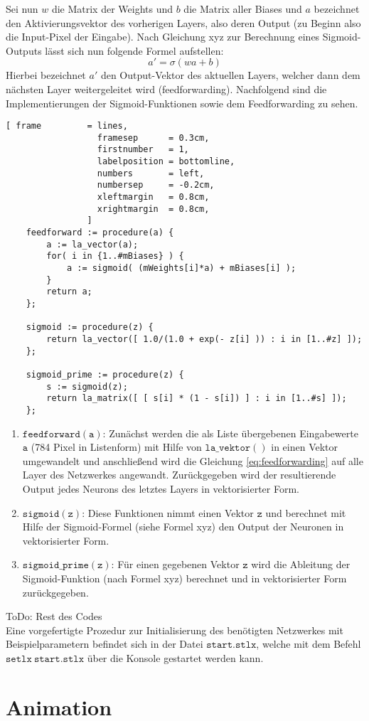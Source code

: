 \noindent
Sei nun $w$ die Matrix der Weights und $b$ die Matrix aller Biases und $a$ bezeichnet den Aktivierungsvektor des vorherigen Layers, also deren Output (zu Beginn also die Input-Pixel der Eingabe). Nach Gleichung xyz zur Berechnung eines Sigmoid-Outputs lässt sich nun folgende Formel aufstellen: 
\begin{equation}\label{eq:feedforwarding}
	a' = \sigma(wa + b)
\end{equation}
\noindent
Hierbei bezeichnet $a'$ den Output-Vektor des aktuellen Layers, welcher dann dem nächsten Layer weitergeleitet wird (feedforwarding). Nachfolgend sind die Implementierungen der Sigmoid-Funktionen sowie dem Feedforwarding zu sehen.
\begin{Verbatim}[ frame         = lines, 
                  framesep      = 0.3cm, 
                  firstnumber   = 1,
                  labelposition = bottomline,
                  numbers       = left,
                  numbersep     = -0.2cm,
                  xleftmargin   = 0.8cm,
                  xrightmargin  = 0.8cm,
                ]
	feedforward := procedure(a) {
		a := la_vector(a);	
		for( i in {1..#mBiases} ) { 
			a := sigmoid( (mWeights[i]*a) + mBiases[i] );
		}
		return a;
	};                
                
	sigmoid := procedure(z) {
		return la_vector([ 1.0/(1.0 + exp(- z[i] )) : i in [1..#z] ]);
	};

	sigmoid_prime := procedure(z) {
		s := sigmoid(z); 
		return la_matrix([ [ s[i] * (1 - s[i]) ] : i in [1..#s] ]);
	};
\end{Verbatim}
\begin{enumerate}
\item $\mathtt{feedforward(a)}$: Zunächst werden die als Liste übergebenen Eingabewerte $\mathtt{a}$ (784 Pixel in Listenform) mit Hilfe von $\mathtt{la\_vektor()}$ in einen Vektor umgewandelt und anschließend wird die Gleichung \eqref{eq:feedforwarding} auf alle Layer des Netzwerkes angewandt. Zurückgegeben wird der resultierende Output jedes Neurons des letztes Layers in vektorisierter Form.
\item $\mathtt{sigmoid(z)}$: Diese Funktionen nimmt einen Vektor $\mathtt{z}$ und berechnet mit Hilfe der Sigmoid-Formel (siehe Formel xyz) den Output der Neuronen in vektorisierter Form.
\item $\mathtt{sigmoid\_prime(z)}$: Für einen gegebenen Vektor $\mathtt{z}$ wird die Ableitung der Sigmoid-Funktion (nach Formel xyz) berechnet und in vektorisierter Form zurückgegeben.
\end{enumerate}

ToDo: Rest des Codes \\

\noindent
Eine vorgefertigte Prozedur zur Initialisierung des benötigten Netzwerkes mit Beispielparametern befindet sich in der Datei $\mathtt{start.stlx}$, welche mit dem Befehl $\mathtt{setlx\ start.stlx}$ über die Konsole gestartet werden kann.

\section{Animation}